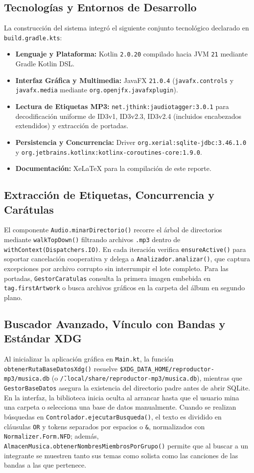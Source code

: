 \documentclass[12pt,a4paper]{article}
\begin{document}
\subsection{Tecnologías y Entornos de Desarrollo}
La construcción del sistema integró el siguiente conjunto tecnológico declarado en \texttt{build.gradle.kts}:
\begin{itemize}
    \item \textbf{Lenguaje y Plataforma:} Kotlin \texttt{2.0.20} compilado hacia JVM \texttt{21} mediante Gradle Kotlin DSL.
    \item \textbf{Interfaz Gráfica y Multimedia:} JavaFX \texttt{21.0.4} (\texttt{javafx.controls} y \texttt{javafx.media} mediante \texttt{org.openjfx.javafxplugin}).
    \item \textbf{Lectura de Etiquetas MP3:} \texttt{net.jthink:jaudiotagger:3.0.1} para decodificación uniforme de ID3v1, ID3v2.3, ID3v2.4 (incluidos encabezados extendidos) y extracción de portadas.
    \item \textbf{Persistencia y Concurrencia:} Driver \texttt{org.xerial:sqlite-jdbc:3.46.1.0} y \texttt{org.jetbrains.kotlinx:kotlinx-coroutines-core:1.9.0}.
    \item \textbf{Documentación:} XeLaTeX para la compilación de este reporte.
\end{itemize}

\subsection{Extracción de Etiquetas, Concurrencia y Carátulas}
El componente \texttt{Audio.minarDirectorio()} recorre el árbol de directorios mediante \texttt{walkTopDown()} filtrando archivos \texttt{.mp3} dentro de \texttt{withContext(Dispatchers.IO)}. En cada iteración verifica \texttt{ensureActive()} para soportar cancelación cooperativa y delega a \texttt{Analizador.analizar()}, que captura excepciones por archivo corrupto sin interrumpir el lote completo. Para las portadas, \texttt{GestorCaratulas} consulta la primera imagen embebida en \texttt{tag.firstArtwork} o busca archivos gráficos en la carpeta del álbum en segundo plano.

\subsection{Buscador Avanzado, Vínculo con Bandas y Estándar XDG}
Al inicializar la aplicación gráfica en \texttt{Main.kt}, la función \texttt{obtenerRutaBaseDatosXdg()} resuelve \texttt{\$XDG\_DATA\_HOME/reproductor-mp3/musica.db} (o \texttt{\~/.local/share/reproductor-mp3/musica.db}), mientras que \texttt{GestorBaseDatos} asegura la existencia del directorio padre antes de abrir SQLite. En la interfaz, la biblioteca inicia oculta al arrancar hasta que el usuario mina una carpeta o selecciona una base de datos manualmente. Cuando se realizan búsquedas en \texttt{Controlador.ejecutarBusqueda()}, el texto es dividido en cláusulas \texttt{OR} y tokens separados por espacios o \texttt{\&}, normalizados con \texttt{Normalizer.Form.NFD}; además, \texttt{AlmacenMusica.obtenerNombresMiembrosPorGrupo()} permite que al buscar a un integrante se muestren tanto sus temas como solista como las canciones de las bandas a las que pertenece.
\end{document}

